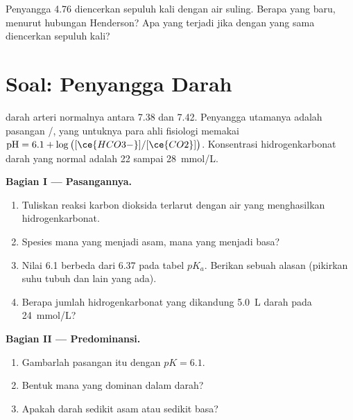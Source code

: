 \begin{exercise}[$\star\star\star$]\label{exo:g12:buffers-predominance:15}
Penyangga  4.76 diencerkan sepuluh kali dengan air suling. Berapa
 yang baru, menurut hubungan Henderson? Apa yang terjadi jika  dengan  yang sama diencerkan sepuluh kali?
\end{exercise}

\section{Soal: Penyangga Darah}

\begin{problem}
\label{pb:g12:buffers-predominance:1}
 darah arteri normalnya antara 7.38 dan 7.42. Penyangga utamanya
adalah pasangan /, yang untuknya para ahli
fisiologi memakai $\mathrm{pH} = 6.1 + \log\big([\ce{HCO3-}]/[\ce{CO2}]\big)$.
Konsentrasi hidrogenkarbonat darah yang normal adalah 22 sampai
\qty{28}{mmol/L}.

\medskip
\noindent\textbf{Bagian I --- Pasangannya.}
\begin{enumerate}
  \item Tuliskan reaksi karbon dioksida terlarut dengan air yang
        menghasilkan  hidrogenkarbonat.
  \item Spesies mana yang menjadi asam, mana yang menjadi basa?
  \item Nilai 6.1 berbeda dari 6.37 pada tabel $pK_a$. Berikan sebuah
        alasan (pikirkan suhu tubuh dan  lain yang ada).
  \item Berapa jumlah hidrogenkarbonat yang dikandung \qty{5.0}{L} darah
        pada \qty{24}{mmol/L}?
\end{enumerate}

\medskip
\noindent\textbf{Bagian II --- Predominansi.}
\begin{enumerate}[resume]
  \item Gambarlah  pasangan itu dengan $pK = 6.1$.
  \item Bentuk mana yang dominan dalam darah?
  \item Apakah darah sedikit asam atau sedikit basa?
\end{enumerate}


\end{problem}
